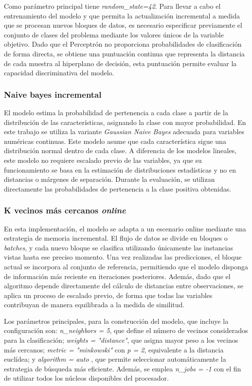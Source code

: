 \documentclass[12pt,a4paper]{report}
\begin{document}
Como parámetro principal tiene \emph{random\_state=42}. Para llevar a cabo el entrenamiento del modelo y que permita la actualización incremental a medida que se procesan nuevos bloques de datos, es necesario especificar previamente el conjunto de clases del problema mediante los valores únicos de la variable objetivo. Dado que el Perceptrón no proporciona probabilidades de clasificación de forma directa, se obtiene una puntuación continua que representa la distancia de cada muestra al hiperplano de decisión, esta puntuación permite evaluar la capacidad discriminativa del modelo.


\subsubsection{Naive bayes incremental}

El modelo estima la probabilidad de pertenencia a cada clase a partir de la distribución de las características, asignando la clase con mayor probabilidad. En este trabajo se utiliza la variante \emph{Gaussian Naive Bayes} adecuada para variables numéricas continuas. Este modelo asume que cada característica sigue una distribución normal dentro de cada clase. A diferencia de los modelos lineales, este modelo no requiere escalado previo de las variables, ya que su funcionamiento se basa en la estimación de distribuciones estadísticas y no en distancias o márgenes de separación. Durante la evaluación, se utilizan directamente las probabilidades de pertenencia a la clase positiva obtenidas. 


\subsubsection{K vecinos más cercanos \emph{online}}

En esta implementación, el modelo se adapta a un escenario online mediante una estrategia de memoria incremental. El flujo de datos se divide en bloques o \emph{batches}, y cada nuevo bloque se clasifica utilizando únicamente las instancias vistas hasta ese preciso momento. Una vez realizadas las predicciones, el bloque actual se incorpora al conjunto de referencia, permitiendo que el modelo disponga de información más reciente en iteraciones posteriores. Además, dado que el algoritmo depende directamente del cálculo de distancias entre observaciones, se aplica un proceso de escalado previo, de forma que todas las variables contribuyan de manera equilibrada a la medida de similitud.

Los parámetros principales, para la construcción del modelo, que incluye la configuración son: \emph{n\_neighbors = 5}, que define el número de vecinos considerados para la clasificación; \emph{weights = "distance"}, que asigna mayor peso a los vecinos más cercanos; \emph{metric = "minkowski"} con \emph{p = 2}, equivalente a la distancia euclídea; y \emph{algorithm = \textquotedbl{}auto\textquotedbl{} }, que permite seleccionar automáticamente la estrategia de búsqueda más eficiente. Además, se emplea \emph{n\_jobs = -1} con el fin de utilizar todos los núcleos disponibles del procesador.
\end{document}
